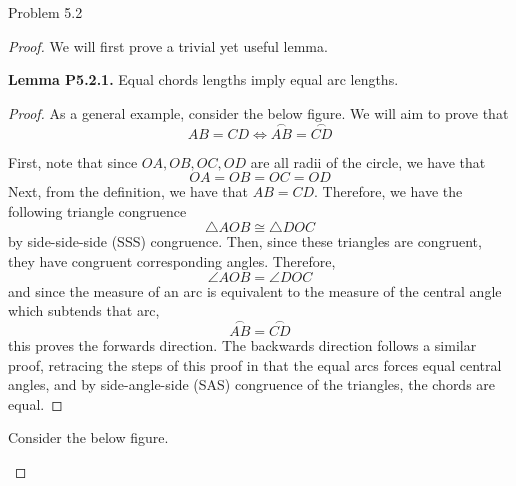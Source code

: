 \begin{sol}{Problem 5.2}
\begin{proof}
We will first prove a trivial yet useful lemma. 

\textbf{Lemma P5.2.1. }Equal chords lengths imply equal arc lengths.
\begin{proof}
As a general example, consider the below figure. We will aim to prove that
\[
AB = CD \iff \overset{\frown}{AB} = \overset{\frown}{CD}
\]
\begin{center}
\end{center}
First, note that since $OA, OB, OC, OD$ are all radii of the circle, we have that
\[
OA = OB = OC = OD
\]
Next, from the definition, we have that $AB = CD$. Therefore, we have the following triangle congruence
\[
\triangle AOB \cong \triangle DOC
\]
by side-side-side (SSS) congruence. Then, since these triangles are congruent, they have congruent corresponding angles. Therefore,
\[
\angle AOB = \angle DOC
\]
and since the measure of an arc is equivalent to the measure of the central angle which subtends that arc,
\[
\overset{\frown}{AB} = \overset{\frown}{CD}
\]
this proves the forwards direction. The backwards direction follows a similar proof, retracing the steps of this proof in that the equal arcs forces equal central angles, and by side-angle-side (SAS) congruence of the triangles, the chords are equal. 
\end{proof}
Consider the below figure.
\begin{center}
\end{center}
\end{proof}
\end{sol}
